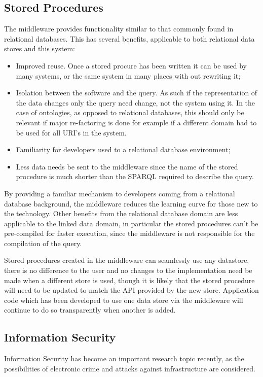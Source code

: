 \subsection{Stored Procedures}
The middleware provides  functionality similar to that commonly found in relational databases. This has several benefits, applicable to both relational data stores and this system:

\begin{itemize}
    \item Improved reuse. Once a stored procure has been written it can be used by many systems, or the same system in many places with out rewriting it;
   \item Isolation between the software and the query. As such if the representation of the data changes only the query need change, not the system using it. In the case of ontologies, as opposed to relational databases, this should only be relevant if major re-factoring is done for example if a different domain had to be used for all URI's in the system.
    \item Familiarity for developers used to a relational database environment;    
    \item Less data needs be sent to the middleware since the name of the stored procedure is much shorter than the SPARQL required to describe the query. 
\end{itemize}

By providing a familiar mechanism to developers coming from a relational database background, the middleware reduces the learning curve for those new to the technology. Other benefits from the relational database domain are less applicable to the linked data domain, in particular the stored procedures can't be pre-compiled for faster execution, since the middleware is not responsible for the compilation of the query.

Stored procedures created in the middleware can seamlessly use any datastore, there is no difference to the user and no changes to the implementation need be made when a different store is used, though it is likely that the stored procedure will need to be updated to match the API provided by the new store. Application code which has been developed to use one data store via the middleware will continue to do so transparently when another is added. 


\subsection{Information Security}
Information Security has become an important research topic recently, as the possibilities of electronic crime and attacks against infrastructure are considered.

